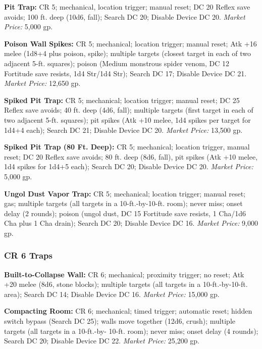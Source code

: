 \documentclass{article}
\begin{document}
\textbf{Pit Trap: }CR 5; mechanical, location trigger; manual reset; DC 20 Reflex 
save avoids; 100 ft. deep (10d6, fall); Search DC 20; Disable Device DC 20. \textit{Market 
Price: }5,000 gp.

\textbf{Poison Wall Spikes: }CR 5; mechanical; location trigger; manual reset; 
Atk +16 melee (1d8+4 plus poison, spike); multiple targets (closest target in each 
of two adjacent 5-ft. squares); poison (Medium monstrous spider venom, DC 12 Fortitude 
save resists, 1d4 Str/1d4 Str); Search DC 17; Disable Device DC 21. \textit{Market 
Price: }12,650 gp.

\textbf{Spiked Pit Trap: }CR 5; mechanical; location trigger; manual reset; DC 
25 Reflex save avoids; 40 ft. deep (4d6, fall); multiple targets (first target 
in each of two adjacent 5-ft. squares); pit spikes (Atk +10 melee, 1d4 spikes per 
target for 1d4+4 each); Search DC 21; Disable Device DC 20. \textit{Market Price: 
}13,500 gp.

\textbf{Spiked Pit Trap (80 Ft. Deep): }CR 5; mechanical; location trigger, manual 
reset; DC 20 Reflex save avoids; 80 ft. deep (8d6, fall), pit spikes (Atk +10 melee, 
1d4 spikes for 1d4+5 each); Search DC 20; Disable Device DC 20. \textit{Market 
Price: }5,000 gp. 

\textbf{Ungol Dust Vapor Trap: }CR 5; mechanical; location trigger; manual reset; 
gas; multiple targets (all targets in a 10-ft.-by-10-ft. room); never miss; onset 
delay (2 rounds); poison (ungol dust, DC 15 Fortitude save resists, 1 Cha/1d6 Cha 
plus 1 Cha drain); Search DC 20; Disable Device DC 16. \textit{Market Price: }9,000 
gp.

\vspace{12pt}
\subsubsection*{\textbf{CR 6 Traps }}

\textbf{Built-to-Collapse Wall:} CR 6; mechanical; proximity trigger; no reset; 
Atk +20 melee (8d6, stone blocks); multiple targets (all targets in a 10-ft.-by-10-ft. 
area); Search DC 14; Disable Device DC 16. \textit{Market Price: }15,000 gp.

\textbf{Compacting Room: }CR 6; mechanical; timed trigger; automatic reset; hidden 
switch bypass (Search DC 25); walls move together (12d6, crush); multiple targets 
(all targets in a 10-ft.-by- 10-ft. room); never miss; onset delay (4 rounds); 
Search DC 20; Disable Device DC 22. \textit{Market Price: }25,200 gp.
\end{document}
